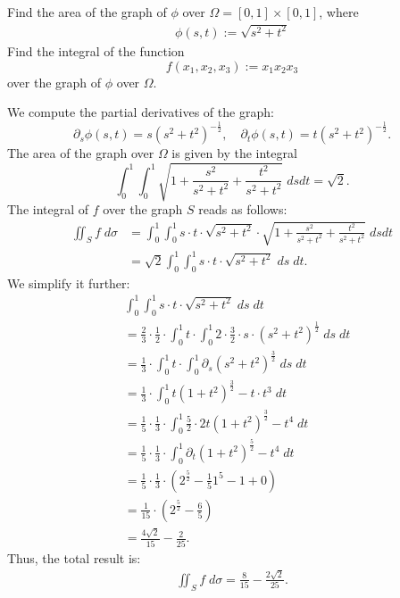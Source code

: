 \documentclass[11pt]{article}
\begin{document}



\begin{exercise}
    Find the area of the graph of $\phi$ over $\Omega = [0,1] \times [0,1]$, where 
    \begin{gather*}
        \phi(s,t) := \sqrt{ s^2 + t^2 }
    \end{gather*}
    Find the integral of the function 
    \[
        f(x_1,x_2,x_3) := x_1 x_2 x_3
    \]
    over the graph of $\phi$ over $\Omega$. 
\end{exercise}
\begin{solution}
    We compute the partial derivatives of the graph:
    \[
        \partial_s \phi(s,t) = s ( s^2 + t^2 )^{- \frac 1 2},
        \quad 
        \partial_t \phi(s,t) = t ( s^2 + t^2 )^{- \frac 1 2}.
    \]
    The area of the graph over $\Omega$ is given by the integral 
    \[
        \int_0^1 \int_0^1 \sqrt{ 1 + \frac{ s^2 }{ s^2 + t^2 } + \frac{ t^2 }{ s^2 + t^2 } } \;dsdt = \sqrt{2}.
    \]
    The integral of $f$ over the graph $S$ reads as follows:
    \begin{align*}
        \iint_S f \;d\sigma
        &=
        \int_0^1 \int_0^1 s \cdot t \cdot \sqrt{ s^2 + t^2 } \cdot \sqrt{ 1 + \frac{ s^2 }{ s^2 + t^2 } + \frac{ t^2 }{ s^2 + t^2 } } \;dsdt
        \\&=
        \sqrt{2}
        \int_0^1 \int_0^1 s \cdot t \cdot \sqrt{ s^2 + t^2 } \;ds \;dt.
    \end{align*}
    We simplify it further:
    \begin{align*}
        &
        \int_0^1 \int_0^1 s \cdot t \cdot \sqrt{ s^2 + t^2 } \;ds \;dt
        \\&
        =
        \frac 2 3 \cdot \frac 1 2 \cdot \int_0^1 t \cdot \int_0^1 2 \cdot \frac 3 2 \cdot s \cdot ( s^2 + t^2 )^{\frac 1 2} \;ds \;dt
        \\&
        =
        \frac 1 3 \cdot \int_0^1 t \cdot \int_0^1 \partial_s ( s^2 + t^2 )^{\frac 3 2} \;ds \;dt
        \\&
        =
        \frac 1 3 \cdot \int_0^1 t ( 1 + t^2 )^{\frac 3 2} - t \cdot t^3 \;dt
        \\&
        =
        \frac 1 5 \cdot \frac 1 3 \cdot \int_0^1 \frac 5 2 \cdot 2t ( 1 + t^2 )^{\frac 3 2} - t^4 \;dt
        \\&
        =
        \frac 1 5 \cdot \frac 1 3 \cdot \int_0^1 \partial_t ( 1 + t^2 )^{\frac 5 2} - t^4 \;dt
        \\&
        =
        \frac 1 5 \cdot \frac 1 3 \cdot \left( 2^{\frac 5 2} - \frac 1 5 1^5 - 1 + 0 \right)
        \\&
        =
        \frac 1 {15} \cdot \left( 2^{\frac 5 2} - \frac 6 5  \right)
        \\&
        =
        \frac{ 4 \sqrt{2} }{15} - \frac{2}{25}
        .
    \end{align*}
    Thus, the total result is:
    \begin{align*}
        \iint_S f \;d\sigma
        =
        \frac{ 8 }{15} - \frac{2 \sqrt 2}{25}
        .
    \end{align*}
\end{solution}
\end{document}
